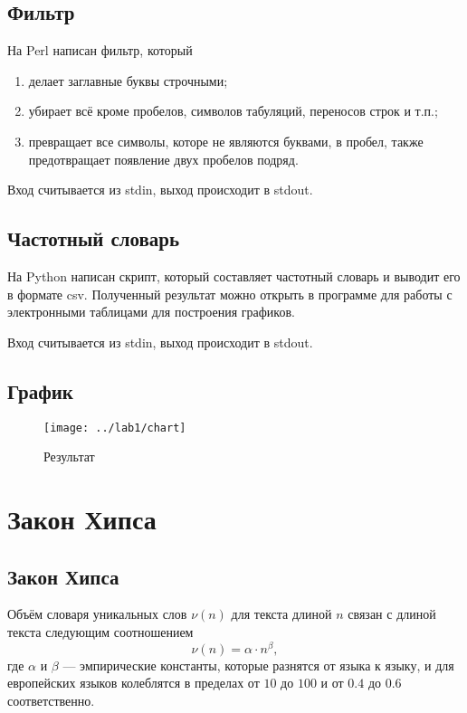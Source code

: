 \section{Фильтр}
На Perl написан фильтр, который
\begin{enumerate}
  \item делает заглавные буквы строчными;
  \item убирает всё кроме пробелов, символов табуляций, переносов строк и т.п.;
  \item превращает все символы, которе не являются буквами, в пробел, также
    предотвращает появление двух пробелов подряд.
\end{enumerate}

Вход считывается из stdin, выход происходит в stdout.

\lstset{inputencoding=utf8, extendedchars=\true}


\section{Частотный словарь}
На Python написан скрипт, который составляет частотный словарь
и выводит его в формате csv.
Полученный результат можно открыть в программе для работы
с электронными таблицами для построения графиков.

Вход считывается из stdin, выход происходит в stdout.

\lstset{inputencoding=utf8, extendedchars=\true}


\section{График}
\begin{figure}[h]
  \centering
  \texttt{[image: ../lab1/chart]}
  \caption{Результат}
\end{figure}

\chapter{Закон Хипса}

\section{Закон Хипса}
Объём словаря уникальных слов $\nu\left( n \right)$
для текста длиной $n$ связан с длиной текста следующим соотношением
\cite{Internetika}
\begin{equation*}
  \nu\left( n \right) = \alpha \cdot n^\beta,
\end{equation*}
где $\alpha$ и $\beta$ --- эмпирические константы,
которые разнятся от языка к языку,
и для европейских языков колеблятся в пределах
от $10$ до $100$ и от $0.4$ до $0.6$ соответственно.

